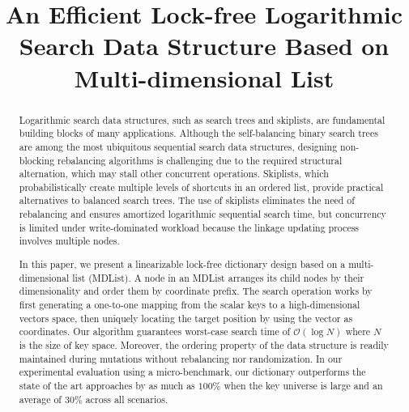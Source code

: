 \documentclass[10pt,conference,compsocconf]{IEEEtran}
\begin{document}
\title{An Efficient Lock-free Logarithmic Search Data Structure Based on Multi-dimensional List}


\author{
}

\maketitle

\begin{abstract}
    Logarithmic search data structures, such as search trees and skiplists, are fundamental building blocks of many applications.
    Although the self-balancing binary search trees are among the most ubiquitous sequential search data structures, designing non-blocking rebalancing algorithms is challenging due to the required structural alternation, which may stall other concurrent operations.
    Skiplists, which probabilistically create multiple levels of shortcuts in an ordered list, provide practical alternatives to balanced search trees.
    The use of skiplists eliminates the need of rebalancing and ensures amortized logarithmic sequential search time, but concurrency is limited under write-dominated workload because the linkage updating process involves multiple nodes.
    
    In this paper, we present a linearizable lock-free dictionary design based on a multi-dimensional list (MDList).
    A node in an MDList arranges its child nodes by their dimensionality and order them by coordinate prefix. 
    The search operation works by first generating a one-to-one mapping from the scalar keys to a high-dimensional vectors space, then uniquely locating the target position by using the vector as coordinates.
    Our algorithm guarantees worst-case search time of $\mathcal{O}(\log N)$ where $N$ is the size of key space.
    Moreover, the ordering property of the data structure is readily maintained during mutations without rebalancing nor randomization. 
    In our experimental evaluation using a micro-benchmark, our dictionary outperforms the state of the art approaches by as much as $100\%$ when the key universe is large and an average of $30\%$ across all scenarios.
\end{abstract}
\end{document}
